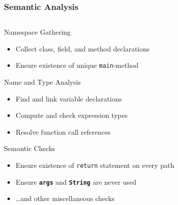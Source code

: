 \documentclass[navbaroff,en]{sdqbeamer}
\begin{document}
\begin{frame}
	\frametitle{Semantic Analysis}
	\begin{columns}
		\begin{column}{0.5\textwidth}

	\begin{contentblock}{Namespace Gathering}
		\begin{itemize}
			\item Collect class, field, and method declarations
			\item Ensure existence of unique \texttt{main}-method
		\end{itemize}
	\end{contentblock}


	\begin{contentblock}{Name and Type Analysis}
		\begin{itemize}
			\item Find and link variable declarations
			\item Compute and check expression types
			\item Resolve function call references
		\end{itemize}
	\end{contentblock}


	\begin{contentblock}{Semantic Checks}
		\begin{itemize}
			\item Ensure existence of \texttt{return} statement on every path
			\item Ensure \texttt{\textbf{args}} and \texttt{\textbf{String}} are never used
			\item \dots and other miscellaneous checks
		\end{itemize}
	\end{contentblock}

\end{column}


\end{columns}
\end{frame}
\end{document}
